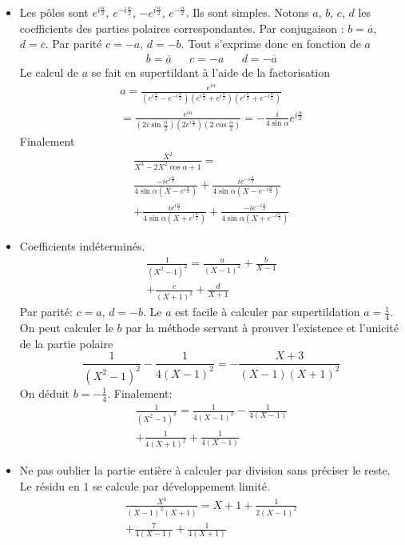 \begin{itemize}
 \item Les pôles sont $e^{i\frac{\alpha}{2}}$, $e^{-i\frac{\alpha}{2}}$, $-e^{i\frac{\alpha}{2}}$, $e^{-\frac{\alpha}{2}}$. Ils sont simples. Notons $a$, $b$, $c$, $d$ les coefficients des parties polaires correspondantes. Par conjugaison : $b=\overline{a}$,  $d=\overline{c}$. Par parité $c=-a$, $d=-b$. Tout s'exprime donc en fonction de $a$
\begin{align*}
 b=\overline{a} & & c=-a & &d= -\overline{a}
\end{align*}
Le calcul de $a$ se fait en supertildant à l'aide de la factorisation
\begin{multline*}
 a=\frac{e^{i\alpha}}{
  \left(e^{i\frac{\alpha}{2}}- e^{-i\frac{\alpha}{2}}\right)
  \left(e^{i\frac{\alpha}{2}}+ e^{i\frac{\alpha}{2}}\right)
  \left(e^{i\frac{\alpha}{2}}+ e^{-i\frac{\alpha}{2}}\right)
 }\\
=\frac{e^{i\alpha}}{
\left(2i\sin\frac{\alpha}{2}\right)
\left( 2e^{i\frac{\alpha}{2}}\right) 
\left(2\cos\frac{\alpha}{2}\right) 
}
=-\frac{i}{4\sin \alpha}e^{i\frac{\alpha}{2}}
\end{multline*}
Finalement
\begin{multline*}
\frac{X^{2}}{X^{4}-2X^{2}\cos \alpha +1}=\\
\frac{-ie^{i\frac{\alpha}{2}}}{4\sin \alpha(X-e^{i\frac{\alpha}{2}})}
+\frac{ie^{-i\frac{\alpha}{2}}}{4\sin \alpha(X-e^{-i\frac{\alpha}{2}})} \\
+\frac{ie^{i\frac{\alpha}{2}}}{4\sin \alpha(X+e^{i\frac{\alpha}{2}})}
+\frac{-ie^{-i\frac{\alpha}{2}}}{4\sin \alpha(X+e^{-i\frac{\alpha}{2}})}
\end{multline*}

 \item Coefficients indéterminés.
\begin{multline*}
 \frac{1}{(X^{2}-1)^{2}}=
\frac{a}{(X-1)^2}+\frac{b}{X-1}\\+\frac{c}{(X+1)^2}+\frac{d}{X+1}
\end{multline*}
Par parité: $c=a$, $d=-b$. Le $a$ est facile à calculer par supertildation $a=\frac{1}{4}$. On peut calculer le $b$ par la méthode servant à prouver l'existence et l'unicité de la partie polaire
\begin{displaymath}
 \frac{1}{(X^{2}-1)^{2}} - \frac{1}{4(X-1)^2}=-\frac{X+3}{(X-1)(X+1)^2}
\end{displaymath}
On déduit $b=-\frac{1}{4}$. Finalement:
\begin{multline*}
 \frac{1}{(X^{2}-1)^{2}}=\frac{1}{4(X-1)^2}-\frac{1}{4(X-1)}\\+\frac{1}{4(X+1)^2}+\frac{1}{4(X-1)}
\end{multline*}

\item Ne pas oublier la partie entière à calculer par division sans préciser le reste. Le résidu en $1$ se calcule par développement limité.
\begin{multline*}
  \frac{X^4}{(X-1)^2(X+1)}
  = X + 1 + \frac{1}{2(X-1)^2} \\
  + \frac{7}{4(X-1)} + \frac{1}{4(X+1)} 
\end{multline*}

\end{itemize}

